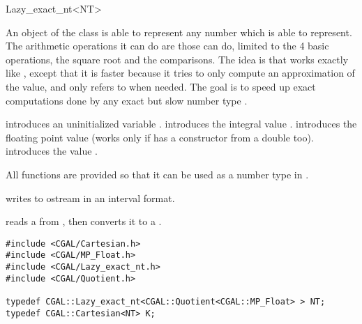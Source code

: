 
\begin{ccClassTemplate} {Lazy_exact_nt<NT>}
\label{lazy_exact_nt}

\ccDefinition
An object of the class  is able to represent any number
which  is able to represent.  The arithmetic operations it can do are
those  can do, limited to the 4 basic operations, the square root and
the comparisons.
The idea is that  works exactly like , except
that it is faster because it tries to only compute an approximation of the
value, and only refers to  when needed.  The goal is to speed up exact
computations done by any exact but slow number type .


\ccCreation
{}

{introduces an uninitialized variable \ccVar.}
\ccGlue
{}
{introduces the integral value .}
\ccGlue
{}
{introduces the floating point value  (works only if  has a
constructor from a double too).}
\ccGlue
{}
{introduces the value .}

\ccOperations
All functions are provided so that it can be used as a number type in
\cgal.

{writes  to ostream  in an interval format.}

{reads a  from , then converts it to a .}

\ccExample

\begin{verbatim}
#include <CGAL/Cartesian.h>
#include <CGAL/MP_Float.h>
#include <CGAL/Lazy_exact_nt.h>
#include <CGAL/Quotient.h>

typedef CGAL::Lazy_exact_nt<CGAL::Quotient<CGAL::MP_Float> > NT;
typedef CGAL::Cartesian<NT> K;
\end{verbatim}

\end{ccClassTemplate} 

